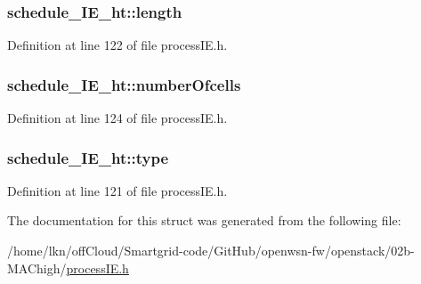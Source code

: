 \subsubsection[{\texorpdfstring{length}{length}}]{ schedule\+\_\+\+I\+E\+\_\+ht\+::length}\hypertarget{structschedule___i_e__ht_afddbf069128e7213406ddde0fb0327f1}{}\label{structschedule___i_e__ht_afddbf069128e7213406ddde0fb0327f1}


Definition at line 122 of file process\+I\+E.\+h.

\subsubsection[{\texorpdfstring{number\+Ofcells}{numberOfcells}}]{ schedule\+\_\+\+I\+E\+\_\+ht\+::number\+Ofcells}\hypertarget{structschedule___i_e__ht_a0793e8247d7c11166539765305911d48}{}\label{structschedule___i_e__ht_a0793e8247d7c11166539765305911d48}


Definition at line 124 of file process\+I\+E.\+h.

\subsubsection[{\texorpdfstring{type}{type}}]{ schedule\+\_\+\+I\+E\+\_\+ht\+::type}\hypertarget{structschedule___i_e__ht_a2629235d8fc16eac19c0040bb068b945}{}\label{structschedule___i_e__ht_a2629235d8fc16eac19c0040bb068b945}


Definition at line 121 of file process\+I\+E.\+h.



The documentation for this struct was generated from the following file\+:\begin{DoxyCompactItemize}
\item 
/home/lkn/off\+Cloud/\+Smartgrid-\/code/\+Git\+Hub/openwsn-\/fw/openstack/02b-\/\+M\+A\+Chigh/\hyperlink{process_i_e_8h}{process\+I\+E.\+h}\end{DoxyCompactItemize}
